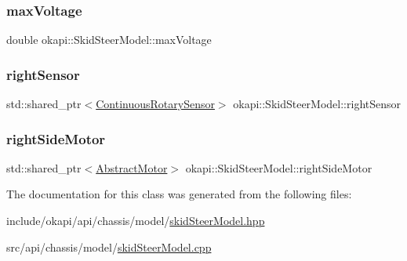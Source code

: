 \subsubsection{\texorpdfstring{maxVoltage}{maxVoltage}}
{\footnotesize\ttfamily double okapi\+::\+Skid\+Steer\+Model\+::max\+Voltage\hspace{0.3cm}{\ttfamily [protected]}}

\mbox{\label{classokapi_1_1SkidSteerModel_a35b26b12648944bb561e7978468fd679}} 
\subsubsection{\texorpdfstring{rightSensor}{rightSensor}}
{\footnotesize\ttfamily std\+::shared\+\_\+ptr$<$\mbox{\hyperlink{classokapi_1_1ContinuousRotarySensor}{Continuous\+Rotary\+Sensor}}$>$ okapi\+::\+Skid\+Steer\+Model\+::right\+Sensor\hspace{0.3cm}{\ttfamily [protected]}}

\mbox{\label{classokapi_1_1SkidSteerModel_a858a234f53f66803c7a498e69c86032b}} 
\subsubsection{\texorpdfstring{rightSideMotor}{rightSideMotor}}
{\footnotesize\ttfamily std\+::shared\+\_\+ptr$<$\mbox{\hyperlink{classokapi_1_1AbstractMotor}{Abstract\+Motor}}$>$ okapi\+::\+Skid\+Steer\+Model\+::right\+Side\+Motor\hspace{0.3cm}{\ttfamily [protected]}}



The documentation for this class was generated from the following files\+:\begin{DoxyCompactItemize}
\item 
include/okapi/api/chassis/model/\mbox{\hyperlink{skidSteerModel_8hpp}{skid\+Steer\+Model.\+hpp}}\item 
src/api/chassis/model/\mbox{\hyperlink{skidSteerModel_8cpp}{skid\+Steer\+Model.\+cpp}}\end{DoxyCompactItemize}
